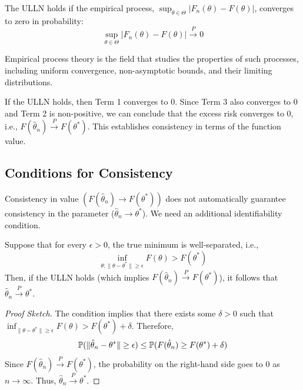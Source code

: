 \begin{de}
The ULLN holds if the empirical process, $\sup_{\theta \in \Theta} |F_n(\theta) - F(\theta)|$, converges to zero in probability:
$$ \sup_{\theta \in \Theta} |F_n(\theta) - F(\theta)| \xrightarrow{P} 0 $$
\end{de}
\begin{remark}
    Empirical process theory is the field that studies the properties of such processes, including uniform convergence, non-asymptotic bounds, and their limiting distributions.
\end{remark}


If the ULLN holds, then Term 1 converges to 0. Since Term 3 also converges to 0 and Term 2 is non-positive, we can conclude that the excess risk converges to 0, i.e., $F(\hat{\theta}_n) \xrightarrow{P} F(\theta^*)$. This establishes consistency in terms of the function value.

\subsection{Conditions for Consistency}
Consistency in value $(F(\hat{\theta}_n) \to F(\theta^*))$ does not automatically guarantee consistency in the parameter ($\hat{\theta}_n \to \theta^*$). We need an additional identifiability condition.

\begin{prop}
    Suppose that for every $\epsilon > 0$, the true minimum is well-separated, i.e.,
$$ \inf_{\theta: \|\theta - \theta^*\| \ge \epsilon} F(\theta) > F(\theta^*) $$
Then, if the ULLN holds (which implies $F(\hat{\theta}_n) \xrightarrow{P} F(\theta^*)$), it follows that $\hat{\theta}_n \xrightarrow{P} \theta^*$.
\end{prop}

\begin{proof}[Proof Sketch]
The condition implies that there exists some $\delta > 0$ such that $\inf_{\|\theta - \theta^*\| \ge \epsilon} F(\theta) > F(\theta^*) + \delta$. 
Therefore,
$$ 
\mathbb{P}(\|\hat{\theta}_n - \theta^*\| \ge \epsilon) \le \mathbb{P}(F(\hat{\theta}_n) \ge F(\theta^*) + \delta) 
$$
Since $F(\hat{\theta}_n) \xrightarrow{P} F(\theta^*)$, the probability on the right-hand side goes to 0 as $n \to \infty$. Thus, $\hat{\theta}_n \xrightarrow{P} \theta^*$.
\end{proof}

